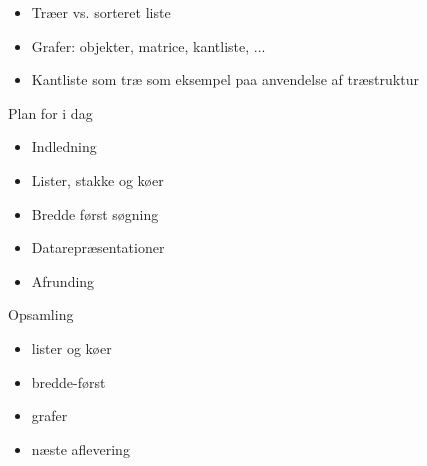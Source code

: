 \documentclass[a4paper,landscape]{slides}
\begin{document}
\begin{slide}
\begin{itemize}
      \item     Træer vs. sorteret liste
      \item     Grafer: objekter, matrice, kantliste, ...
      \item     Kantliste som træ som eksempel paa anvendelse af træstruktur
\end{itemize}\end{slide}\begin{slide} \begin{center} {\large 
            Plan for i dag
} \end{center} \begin{itemize} \addtolength{\itemsep}{-\baselineskip}
\item Indledning
\item Lister, stakke og køer
\item Bredde først søgning
\item Datarepræsentationer
\item Afrunding
\end{itemize}\end{slide}\begin{slide} \begin{center} {\large 
      Opsamling
} \end{center} \begin{itemize} \addtolength{\itemsep}{-\baselineskip}
      \item     lister og køer
      \item     bredde-først
      \item     grafer
      \item     næste aflevering
\end{itemize}\end{slide}
\end{document}
